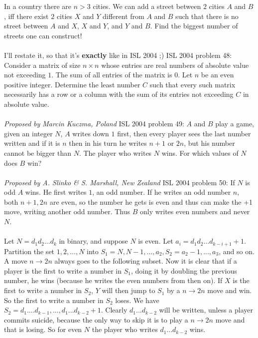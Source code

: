 In a country there are $n>3$ cities. We can add a street between $2$ cities $A$ and $B$, iff there exist $2$ cities $X$ and $Y$ different from $A$ and $B$  such that there is no street between $A$ and $X$, $X$ and $Y$, and $Y$ and $B$. Find the biggest number of streets one can construct! \\\\
I'll restate it, so that it's \textbf{exactly} like in ISL 2004 ;) 
ISL 2004 problem 48:  Consider a matrix of size $n\times n$ whose entries are real numbers of absolute value not exceeding $1$. The sum of all entries of the matrix is $0$. Let $n$ be an even positive integer. Determine the least number $C$ such that every such matrix necessarily has a row or a column with the sum of its entries not exceeding $C$ in absolute value. \\\\
\textit{Proposed by Marcin Kuczma, Poland} 
ISL 2004 problem 49:  $A$ and $B$ play a game, given an integer $N$, $A$ writes down $1$ first, then every player sees the last number written and if it is $n$ then in his turn he writes $n+1$ or $2n$, but his number cannot be bigger than $N$. The player who writes $N$ wins. For which values of $N$ does $B$ win? \\\\
\textit{Proposed by A. Slinko \& S. Marshall, New Zealand} 
ISL 2004 problem 50:  If $N$ is odd $A$ wins. He first writes $1$, an odd number. If he writes an odd number $n$, both $n+1, 2n$ are even, so the number he gets is even and thus can make the +1 move, writing another odd number. Thus $B$ only writes even numbers and never $N$. \\\\
Let $N=d_1d_2...d_k$ in binary, and suppose $N$ is even. Let $a_i=d_1d_2...d_{k-i+1}+1$. Partition the set ${1, 2, ..., N}$ into $S_1={N, N-1, ..., a_2}, S_2={a_2-1, ..., a_3}$, and so on. A move $n \rightarrow 2n$ always goes to the following subset. Now it is clear that if a player is the first to write a number in $S_1$, doing it by doubling the previous number, he wins (because he writes the even numbers from then on). If $X$ is the first to write a number in $S_2$, $Y$ will then jump to $S_1$ by a $n \rightarrow 2n$ move and win. So the first to write a number in $S_2$ loses. We have $S_2={d_1....d_{k-1}, ..., d_1...d_{k-2}+1}$. Clearly $d_1...d_{k-2}$ will be written, unless a player commits suicide, because the only way to skip it is to play a $n \rightarrow 2n$ move and that is losing. So for even $N$ the player who writes $d_1...d_{k-2}$ wins. \\\\

